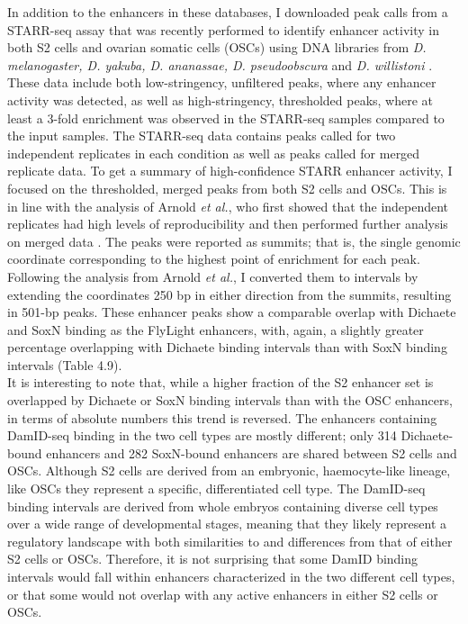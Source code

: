 In addition to the enhancers in these databases, I downloaded peak calls from a STARR-seq assay that was recently performed to identify enhancer activity in both S2 cells and ovarian somatic cells (OSCs) using DNA libraries from \emph{D. melanogaster, D. yakuba, D. ananassae, D. pseudoobscura} and \emph{D. willistoni} \citep{arnold_quantitative_2014}. These data include both low-stringency, unfiltered peaks, where any enhancer activity was detected, as well as high-stringency, thresholded peaks, where at least a 3-fold enrichment was observed in the STARR-seq samples compared to the input samples. The STARR-seq data contains peaks called for two independent replicates in each condition as well as peaks called for merged replicate data. To get a summary of high-confidence STARR enhancer activity, I focused on the thresholded, merged peaks from both S2 cells and OSCs. This is in line with the analysis of Arnold \emph{et al.}, who first showed that the independent replicates had high levels of reproducibility and then performed further analysis on merged data \citep{arnold_quantitative_2014}. The peaks were reported as summits; that is, the single genomic coordinate corresponding to the highest point of enrichment for each peak. Following the analysis from Arnold \emph{et al.}, I converted them to intervals by extending the coordinates 250 bp in either direction from the summits, resulting in 501-bp peaks. These enhancer peaks show a comparable overlap with Dichaete and SoxN binding as the FlyLight enhancers, with, again, a slightly greater percentage overlapping with Dichaete binding intervals than with SoxN binding intervals (Table 4.9).\\

It is interesting to note that, while a higher fraction of the S2 enhancer set is overlapped by Dichaete or SoxN binding intervals than with the OSC enhancers, in terms of absolute numbers this trend is reversed. The enhancers containing DamID-seq binding in the two cell types are mostly different; only 314 Dichaete-bound enhancers and 282 SoxN-bound enhancers are shared between S2 cells and OSCs. Although S2 cells are derived from an embryonic, haemocyte-like lineage, like OSCs they represent a specific, differentiated cell type. The DamID-seq binding intervals are derived from whole embryos containing diverse cell types over a wide range of developmental stages, meaning that they likely represent a regulatory landscape with both similarities to and differences from that of either S2 cells or OSCs. Therefore, it is not surprising that some DamID binding intervals would fall within enhancers characterized in the two different cell types, or that some would not overlap with any active enhancers in either S2 cells or OSCs.\\

